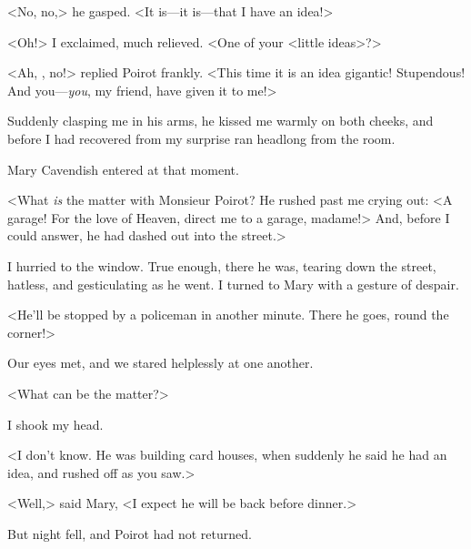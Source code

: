  <No, no,> he gasped. <It is—it is—that I have an idea!> 

 <Oh!> I exclaimed, much relieved. <One of your <little ideas>?> 

 <Ah, , no!> replied Poirot frankly. <This time it is an idea gigantic! Stupendous! And you—\emph{you}, my friend, have given it to me!> 

 Suddenly clasping me in his arms, he kissed me warmly on both cheeks, and before I had recovered from my surprise ran headlong from the room. 

 Mary Cavendish entered at that moment. 

 <What \emph{is} the matter with Monsieur Poirot? He rushed past me crying out: <A garage! For the love of Heaven, direct me to a garage, madame!> And, before I could answer, he had dashed out into the street.> 

 I hurried to the window. True enough, there he was, tearing down the street, hatless, and gesticulating as he went. I turned to Mary with a gesture of despair. 

 <He'll be stopped by a policeman in another minute. There he goes, round the corner!> 

 Our eyes met, and we stared helplessly at one another. 

 <What can be the matter?> 

 I shook my head. 

 <I don't know. He was building card houses, when suddenly he said he had an idea, and rushed off as you saw.> 

 <Well,> said Mary, <I expect he will be back before dinner.> 

 But night fell, and Poirot had not returned. 